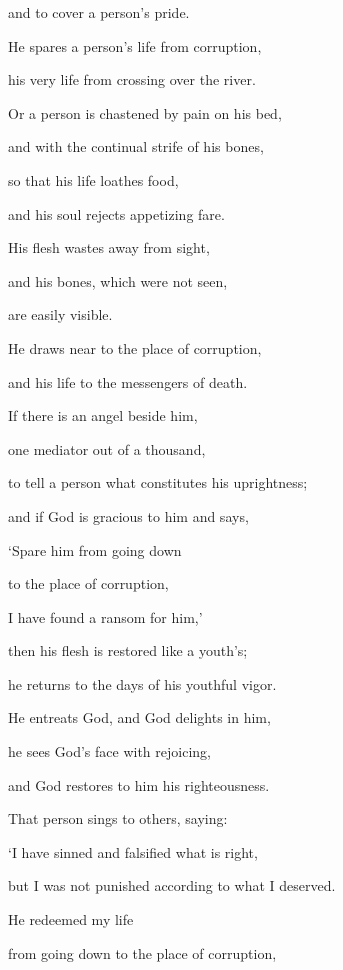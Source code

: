 {\par }{\Q and to cover
a person’s
pride.
\par }{\Q {}He spares
a person’s life
from
corruption,
\par }{\Q his very life
from crossing over
the river.
\par }{\Q {}Or
a person is chastened
by pain
on
his bed,
\par }{\Q and with the continual
strife
of his bones,
\par }{\Q {}so that his life
loathes
food,
\par }{\Q and his soul
rejects appetizing
fare.
\par }{\Q {}His flesh
wastes away
from sight,
\par }{\Q and his bones,
which were not
seen,
\par }{\Q are easily visible.
\par }{\Q {}He draws near
to the place of corruption,
\par }{\Q and his life
to the messengers of death.
\par }{\Q {}If
there is
an angel
beside
him,
\par }{\Q one
mediator
out of a thousand,
\par }{\Q to tell
a person
what constitutes his uprightness;
\par }{\Q {}and if God is gracious
to him and says,
\par }{\Q ‘Spare
him from going down
\par }{\Q to the place of corruption,
\par }{\Q I have found
a ransom for him,’
\par }{\Q {}then his flesh
is restored
like a youth’s;
\par }{\Q he returns
to the days
of his youthful vigor.
\par }{\Q {}He entreats
God,
and God delights
in him,
\par }{\Q he sees
God’s face
with rejoicing,
\par }{\Q and God restores
to him his righteousness.
\par }{\Q {}That person sings
to others, saying:
\par }{\Q ‘I have sinned
and falsified
what is right,
\par }{\Q but I was not
punished according to what I deserved.
\par }{\Q {}He redeemed
my life
\par }{\Q from going down
to the place of corruption,
}
